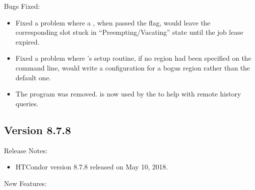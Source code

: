 \noindent Bugs Fixed:

\begin{itemize}

\item Fixed a problem where a , when passed the
 flag, would leave the corresponding slot stuck in
``Preempting/Vacating'' state until the job lease expired.

\item Fixed a problem where 's setup routine, if no region
had been specified on the command line, would write a configuration for a
bogus region rather than the default one.

\item The  program was removed.  is
now used by the  to help with remote history queries.

\end{itemize}

\subsection*{\label{sec:New-8-7-8}Version 8.7.8}

\noindent Release Notes:

\begin{itemize}

\item HTCondor version 8.7.8 released on May 10, 2018.

\end{itemize}


\noindent New Features:

